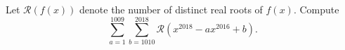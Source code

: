 Let $\mathcal{R}(f(x))$ denote the number of distinct real roots of $f(x)$. Compute$$\sum_{a=1}^{1009}\sum_{b=1010}^{2018}\mathcal{R}(x^{2018}-ax^{2016}+b).$$